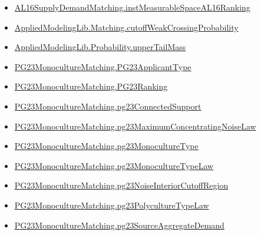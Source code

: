\documentclass[10pt]{article}
\begin{document}
\begin{itemize}\raggedright
\item \hyperlink{governing-declaration-45aa1aca7604d942}{AL16\allowbreak{}Supply\allowbreak{}Demand\allowbreak{}Matching.\allowbreak{}inst\allowbreak{}Measurable\allowbreak{}Space\allowbreak{}AL16\allowbreak{}Ranking}
\item \hyperlink{governing-declaration-b9347ec8cbc98b34}{Applied\allowbreak{}Modeling\allowbreak{}Lib.\allowbreak{}Matching.\allowbreak{}cutoff\allowbreak{}Weak\allowbreak{}Crossing\allowbreak{}Probability}
\item \hyperlink{governing-declaration-f983ca9c59dc317f}{Applied\allowbreak{}Modeling\allowbreak{}Lib.\allowbreak{}Probability.\allowbreak{}upper\allowbreak{}Tail\allowbreak{}Mass}
\item \hyperlink{paper-prerequisite-40ad59c353cf95ec}{PG23\allowbreak{}Monoculture\allowbreak{}Matching.\allowbreak{}PG23\allowbreak{}Applicant\allowbreak{}Type}
\item \hyperlink{paper-prerequisite-8769258a80216d15}{PG23\allowbreak{}Monoculture\allowbreak{}Matching.\allowbreak{}PG23\allowbreak{}Ranking}
\item \hyperlink{paper-prerequisite-3ea91dd17eec5e64}{PG23\allowbreak{}Monoculture\allowbreak{}Matching.\allowbreak{}pg23\allowbreak{}Connected\allowbreak{}Support}
\item \hyperlink{paper-prerequisite-8df4ad9724d0cb72}{PG23\allowbreak{}Monoculture\allowbreak{}Matching.\allowbreak{}pg23\allowbreak{}Maximum\allowbreak{}Concentrating\allowbreak{}Noise\allowbreak{}Law}
\item \hyperlink{paper-prerequisite-b9706024b8c86426}{PG23\allowbreak{}Monoculture\allowbreak{}Matching.\allowbreak{}pg23\allowbreak{}Monoculture\allowbreak{}Type}
\item \hyperlink{paper-prerequisite-e248b62a880a6917}{PG23\allowbreak{}Monoculture\allowbreak{}Matching.\allowbreak{}pg23\allowbreak{}Monoculture\allowbreak{}Type\allowbreak{}Law}
\item \hyperlink{governing-declaration-eaaebb71d2e76d9b}{PG23\allowbreak{}Monoculture\allowbreak{}Matching.\allowbreak{}pg23\allowbreak{}Noise\allowbreak{}Interior\allowbreak{}Cutoff\allowbreak{}Region}
\item \hyperlink{paper-prerequisite-57a6e28ae64a74da}{PG23\allowbreak{}Monoculture\allowbreak{}Matching.\allowbreak{}pg23\allowbreak{}Polyculture\allowbreak{}Type\allowbreak{}Law}
\item \hyperlink{paper-prerequisite-3fb2e1ac28891e7d}{PG23\allowbreak{}Monoculture\allowbreak{}Matching.\allowbreak{}pg23\allowbreak{}Source\allowbreak{}Aggregate\allowbreak{}Demand}

\end{itemize}
\end{document}
